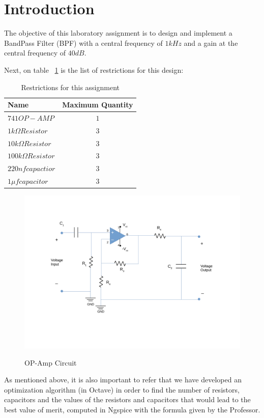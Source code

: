 \newpage
\section{Introduction}
\label{sec:introduction}

The objective of this laboratory assignment is to design and implement a BandPass Filter (BPF) with a central frequency of $1kHz$ and a gain at the central frequency of $40dB$.

Next, on table ~\ref{tab:restrictions} is the list of restrictions for this design:

\begin{table}[h]
    \centering
    \begin{tabular}{|l|c|}
    \hline
    {\bf Name} & {\bf Maximum Quantity} \\ \hline
    $741 OP-AMP$ & $1$ \\ \hline
    $1k{\Omega} Resistor$ & $3$ \\ \hline
    $10k{\Omega}Resistor$ & $3$ \\ \hline
    $100k{\Omega} Resistor$ & $3$ \\ \hline
    $220nf  capactior$ & $3$ \\ \hline
    $1{\mu}f  capacitor$ & $3$ \\ \hline
    \end{tabular}
    \caption{Restrictions for this assignment}
    \label{tab:restrictions}
\end{table}


\begin{figure}[!ht] \centering

\caption{OP-Amp Circuit}
\squeezeup
\squeezeup



\includegraphics[width=1\textwidth, scale=1.0]{DesenhoT5.pdf}  
\squeezeup
\squeezeup
\squeezeup
\squeezeup
\squeezeup
\squeezeup
\label{fig:circuit}
\end{figure}

As mentioned above, it is also important to refer that we have developed an optimization algorithm (in Octave) in order to find the number of resistors, capacitors and the values of the resistors and capacitors that would lead to the best value of merit, computed in Ngspice with the formula given by the Professor.   

